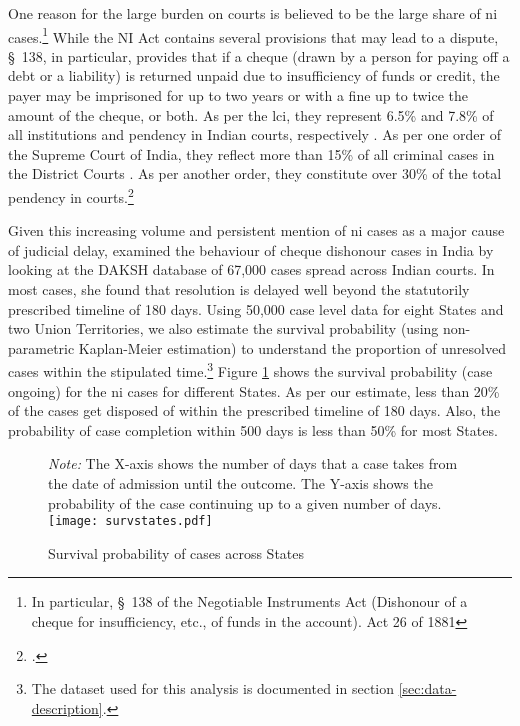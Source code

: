\documentclass[12pt,a4paper]{article}
\begin{document}
One reason for the large burden on courts is believed to be the large share of \gls{ni} cases.\footnote{In particular, \S~138 of the Negotiable Instruments Act (Dishonour of a cheque for insufficiency, etc., of funds in the account). Act 26 of 1881} While the NI Act contains several provisions that may lead to a dispute, \S~138, in particular, provides that if a cheque (drawn by a person for paying off a debt or a liability) is returned unpaid due to insufficiency of funds or credit, the payer may be imprisoned for up to two years or with a fine up to twice the amount of the cheque, or both. As per the \gls{lci}, they represent 6.5\% and 7.8\% of all institutions and pendency in Indian courts, respectively \autocite{lci2014_arrears}. As per one order of the Supreme Court of India, they reflect more than 15\% of all criminal cases in the District Courts \autocite{sc2020_makwanavstate}. As per another order, they constitute over 30\% of the total pendency in courts.\footcite[Similarly, a study published by the Department of Justice briefly touches on the burden of such cases on the judiciary and posits that they constitute 34\% of pending criminal cases in Maharashtra.][]{sc2020_138, mahadik2018_maharashtra}

Given this increasing volume and persistent mention of \gls{ni} cases as a major cause of judicial delay, \cite{sridhar2017_cheque} examined the behaviour of cheque dishonour cases in India by looking at the DAKSH database of 67,000 cases spread across Indian courts. In most cases, she found that resolution is delayed well beyond the statutorily prescribed timeline of 180 days. Using 50,000 case level data for eight States and two Union Territories, we also estimate the survival probability (using non-parametric Kaplan-Meier estimation) to understand the proportion of unresolved cases within the stipulated time.\footnote{The dataset used for this analysis is documented in section \ref{sec:data-description}.} Figure \ref{fig:stateSurvival} shows the survival probability (case ongoing) for the \gls{ni} cases for different States. As per our estimate, less than 20\% of the cases get disposed of within the prescribed timeline of 180 days. Also, the probability of case completion within 500 days is less than 50\% for most States.

\begin{figure}[!ht]
\centering
\caption{Survival probability of cases across States}\label{fig:stateSurvival}
\footnotesize
\textit{Note:} The X-axis shows the number of days that a case takes from the date of admission until the outcome. The Y-axis shows the probability of the case continuing up to a given number of days.
\texttt{[image: survstates.pdf]}
\end{figure}
\end{document}
